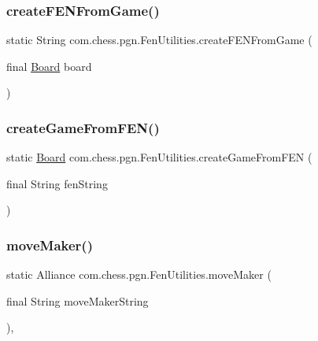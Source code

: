 \subsubsection{\texorpdfstring{createFENFromGame()}{createFENFromGame()}}
{\footnotesize\ttfamily static String com.\+chess.\+pgn.\+Fen\+Utilities.\+create\+F\+E\+N\+From\+Game (\begin{DoxyParamCaption}\item[{final \mbox{\hyperlink{classcom_1_1chess_1_1engine_1_1classic_1_1board_1_1_board}{Board}}}]{board }\end{DoxyParamCaption})\hspace{0.3cm}{\ttfamily [static]}}

\mbox{\label{classcom_1_1chess_1_1pgn_1_1_fen_utilities_afbf8cd13d7769f998f599cb6698377c7}} 
\subsubsection{\texorpdfstring{createGameFromFEN()}{createGameFromFEN()}}
{\footnotesize\ttfamily static \mbox{\hyperlink{classcom_1_1chess_1_1engine_1_1classic_1_1board_1_1_board}{Board}} com.\+chess.\+pgn.\+Fen\+Utilities.\+create\+Game\+From\+F\+EN (\begin{DoxyParamCaption}\item[{final String}]{fen\+String }\end{DoxyParamCaption})\hspace{0.3cm}{\ttfamily [static]}}

\mbox{\label{classcom_1_1chess_1_1pgn_1_1_fen_utilities_abeaac0be72403204f3b07f0d04ee04b6}} 
\subsubsection{\texorpdfstring{moveMaker()}{moveMaker()}}
{\footnotesize\ttfamily static Alliance com.\+chess.\+pgn.\+Fen\+Utilities.\+move\+Maker (\begin{DoxyParamCaption}\item[{final String}]{move\+Maker\+String }\end{DoxyParamCaption})\hspace{0.3cm}{\ttfamily [static]}, {\ttfamily [private]}}

